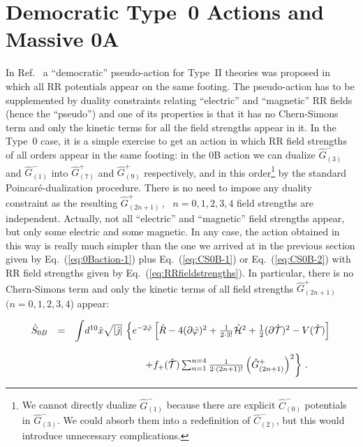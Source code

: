 \documentclass[12pt,a4paper]{article}
\begin{document}
\section{Democratic Type~0 Actions and Massive 0A}
\label{sec:DemAction}
%
In Ref.~\cite{kn:BKORvP} a ``democratic'' pseudo-action for Type~II
theories was proposed in which all RR potentials appear on the same
footing. The pseudo-action has to be supplemented by duality
constraints relating ``electric'' and ``magnetic'' RR fields (hence
the ``pseudo'') and one of its properties is that it has no
Chern-Simons term and only the kinetic terms for all the field
strengths appear in it. In the Type~0 case, it is a simple exercise to
get an action in which RR field strengths of all orders appear in the
same footing: in the 0B action we can dualize $\hat{G}^{-}_{(3)}$ and
$\hat{G}^{-}_{(1)}$ into $\hat{G}^{+}_{(7)}$ and $\hat{G}^{+}_{(9)}$
respectively, and in this order\footnote{We cannot directly dualize
  $\hat{G}^{-}_{(1)}$ because there are explicit $\hat{C}^{-}_{(0)}$
  potentials in $\hat{G}^{-}_{(3)}$. We could absorb them into a
  redefinition of $\hat{C}^{-}_{(2)}$, but this would introduce
  unnecessary complications.} by the standard Poincar\'e-dualization
procedure. There is no need to impose any duality constraint as the
resulting $\hat{G}^{+}_{(2n+1)}\, ,\,\,\,\, n=0,1,2,3,4$ field
strengths are independent. Actually, not all ``electric'' and
``magnetic'' field strengths appear, but only some electric and some
magnetic. In any case, the action obtained in this way is really much
simpler than the one we arrived at in the previous section
given by Eq.~(\ref{eq:0Baction-1}) plus
Eq.~(\ref{eq:CS0B-1}) or Eq.~(\ref{eq:CS0B-2}) with RR field strengths
given by Eq.~(\ref{eq:RRfieldstrengths}). In particular, there is no
Chern-Simons term and only the kinetic terms of all field strengths
$\hat{G}^{+}_{(2n+1)}$ $(n=0,1,2,3,4$) appear:

\begin{equation}
\label{eq:0Baction-2}
\begin{array}{rcl}
\hat{S}_{0B} & = & {\displaystyle\int} d^{10}\hat{x}\sqrt{|\hat{\jmath}|}\,
\left\{e^{-2\hat{\varphi}} \left[ \hat{R} -4(\partial\hat{\varphi})^{2}
+\frac{1}{2\cdot 3!}\hat{\cal H}^{2}+\frac{1}{2}(\partial\hat{\cal T})^{2}
-V(\hat{\cal T})
\right] \right.\\
& & \\
& & 
\hspace{2.5cm}
\left.
+f_{+}(\hat{\cal T})\sum_{n=1}^{n=4}\frac{1}{2\cdot (2n+1)!}
\left(\hat{G}_{(2n+1)}^{+}\right)^{2} 
\right\}\, .\\
\end{array}
\end{equation}
\end{document}
